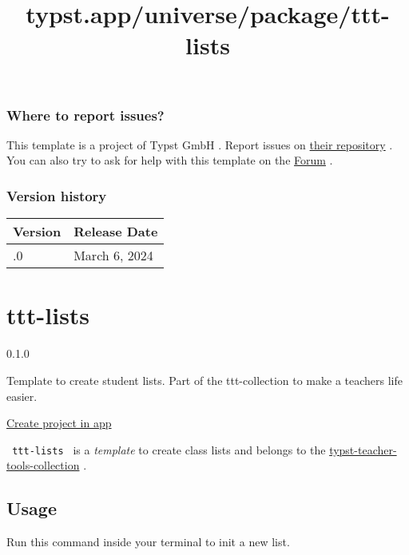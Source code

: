 \subsubsection{Where to report issues?}\label{where-to-report-issues}

This template is a project of Typst GmbH . Report issues on
\href{https://github.com/typst/templates}{their repository} . You can
also try to ask for help with this template on the
\href{https://forum.typst.app}{Forum} .

\label{versions}
\subsubsection{Version history}\label{version-history}

\begin{longtable}[]{@{}ll@{}}
\toprule\noalign{}
Version & Release Date \\
\midrule\noalign{}
\endhead
\bottomrule\noalign{}
\endlastfoot
0.1.0 & March 6, 2024 \\
\end{longtable}


\title{typst.app/universe/package/ttt-lists}

\label{banner}
\label{template-thumbnail}

\section{ttt-lists}\label{ttt-lists}

{ 0.1.0 }

Template to create student lists. Part of the ttt-collection to make a
teachers life easier.

\href{/app?template=ttt-lists&version=0.1.0}{Create project in app}

\label{readme}
\texttt{\ ttt-lists\ } is a \emph{template} to create class lists and
belongs to the
\href{https://github.com/jomaway/typst-teacher-templates}{typst-teacher-tools-collection}
.

\subsection{Usage}\label{usage}

Run this command inside your terminal to init a new list.

